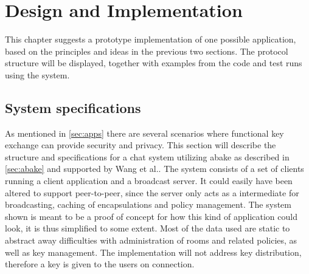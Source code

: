 \chapter{Design and Implementation}\label{chp:designimpl}
This chapter suggests a prototype implementation of one possible application, based on the principles and ideas in the previous two sections. The protocol structure will be displayed, together with examples from the code and test runs using the system.

\section{System specifications}\label{sec:chat}
As mentioned in \ref{sec:apps} there are several scenarios where functional key exchange can provide security and privacy. This section will describe the structure and specifications for a chat system utilizing \gls{abake} as described in \ref{sec:abake} and  supported by Wang et al.\cite{DBLP:abake}. The system consists of a set of clients running a client application and a broadcast server. It could easily have been altered to support peer-to-peer, since the server only acts as a intermediate for broadcasting, caching of encapsulations and policy management. The system shown is meant to be a proof of concept for how this kind of application could look, it is thus simplified to some extent. Most of the data used are static to abstract away difficulties with administration of rooms and related policies, as well as key management. The implementation will not address key distribution, therefore a key is given to the users on connection. 



